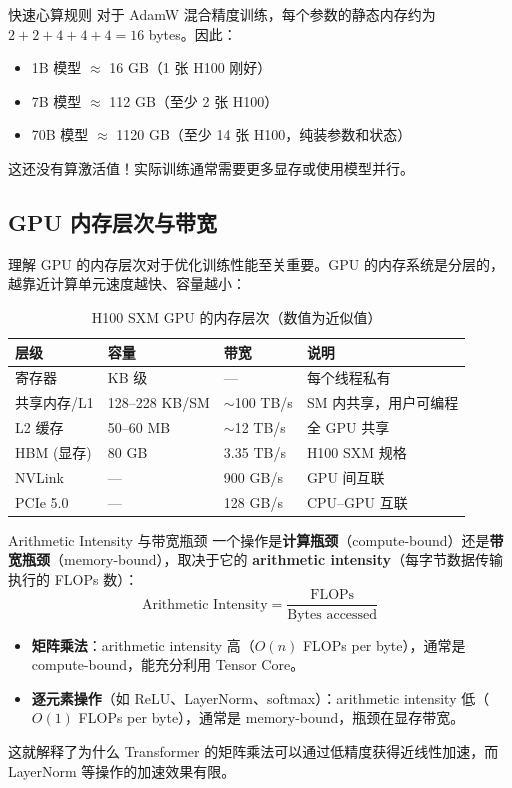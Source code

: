 \begin{knowledgebox}{快速心算规则}
对于 AdamW 混合精度训练，每个参数的静态内存约为 $2 + 2 + 4 + 4 + 4 = 16$ bytes。因此：
\begin{itemize}
    \item 1B 模型 $\approx$ 16 GB（1 张 H100 刚好）
    \item 7B 模型 $\approx$ 112 GB（至少 2 张 H100）
    \item 70B 模型 $\approx$ 1120 GB（至少 14 张 H100，纯装参数和状态）
\end{itemize}
这还没有算激活值！实际训练通常需要更多显存或使用模型并行。
\end{knowledgebox}

\subsection{GPU 内存层次与带宽}

理解 GPU 的内存层次对于优化训练性能至关重要。GPU 的内存系统是分层的，越靠近计算单元速度越快、容量越小：

\begin{table}[H]
\centering
\begin{tabular}{p{}p{}p{}p{}}
\toprule
\textbf{层级} & \textbf{容量} & \textbf{带宽} & \textbf{说明} \\
\midrule
寄存器 & KB 级 & --- & 每个线程私有 \\
共享内存/L1 & 128--228 KB/SM & $\sim$100 TB/s & SM 内共享，用户可编程 \\
L2 缓存 & 50--60 MB & $\sim$12 TB/s & 全 GPU 共享 \\
HBM (显存) & 80 GB & 3.35 TB/s & H100 SXM 规格 \\
NVLink & --- & 900 GB/s & GPU 间互联 \\
PCIe 5.0 & --- & 128 GB/s & CPU--GPU 互联 \\
\bottomrule
\end{tabular}
\caption{H100 SXM GPU 的内存层次（数值为近似值）}
\end{table}

\begin{importantbox}{Arithmetic Intensity 与带宽瓶颈}
一个操作是\textbf{计算瓶颈}（compute-bound）还是\textbf{带宽瓶颈}（memory-bound），取决于它的 \textbf{arithmetic intensity}（每字节数据传输执行的 FLOPs 数）：
$$
\text{Arithmetic Intensity} = \frac{\text{FLOPs}}{\text{Bytes accessed}}
$$
\begin{itemize}
    \item \textbf{矩阵乘法}：arithmetic intensity 高（$O(n)$ FLOPs per byte），通常是 compute-bound，能充分利用 Tensor Core。
    \item \textbf{逐元素操作}（如 ReLU、LayerNorm、softmax）：arithmetic intensity 低（$O(1)$ FLOPs per byte），通常是 memory-bound，瓶颈在显存带宽。
\end{itemize}
这就解释了为什么 Transformer 的矩阵乘法可以通过低精度获得近线性加速，而 LayerNorm 等操作的加速效果有限。
\end{importantbox}

